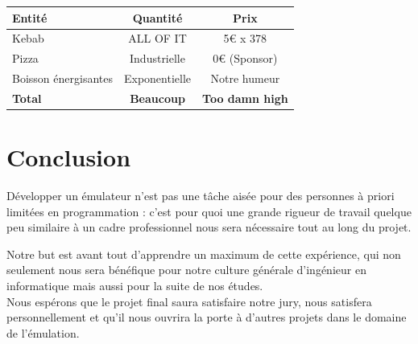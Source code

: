 \documentclass[12pt, a4paper]{article}
\begin{document}
\bigskip

\begin{center}
\begin{tabular}{|l|c|c|}
\hline
\bf Entité & \bf Quantité & \bf Prix \\
\hline 
Kebab & ALL OF IT & 5€ x 378\\
\hline
Pizza & Industrielle & 0€ (Sponsor) \\
\hline
Boisson énergisantes & Exponentielle & Notre humeur \\
\hline
\bf Total & \bf Beaucoup  & \bf Too damn high \\
\hline
\end{tabular}
\end{center}

\pagebreak

\section{Conclusion}
Développer un émulateur n'est pas une tâche aisée pour des personnes à priori limitées en programmation : c'est pour quoi une grande rigueur de travail quelque peu similaire à un cadre professionnel nous sera nécessaire tout au long du projet.
\medskip

Notre but est avant tout d'apprendre un maximum de cette expérience, qui non seulement nous sera bénéfique pour notre culture générale d'ingénieur en informatique mais aussi pour la suite de nos études. \\
Nous espérons que le projet final saura satisfaire notre jury, nous satisfera personnellement et qu'il nous ouvrira la porte à d'autres projets dans le domaine de l'émulation. 
\end{document}
